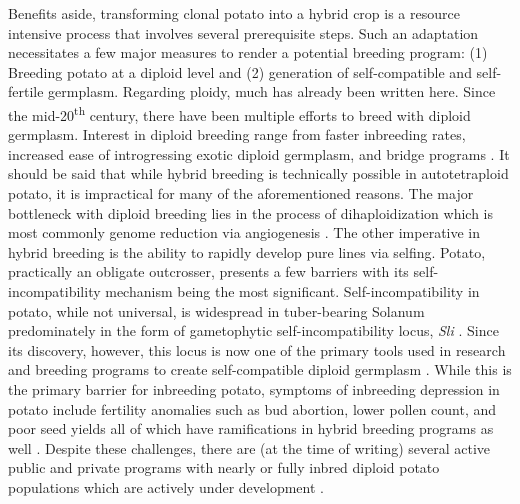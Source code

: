 \begin{refsection}
Benefits aside, transforming clonal potato into a hybrid crop is a
resource intensive process that involves several prerequisite steps.
Such an adaptation necessitates a few major measures to render a
potential breeding program: (1) Breeding potato at a diploid level and
(2) generation of self-compatible and self-fertile germplasm. Regarding
ploidy, much has already been written here. Since the
mid-20\textsuperscript{th} century, there have been multiple efforts to
breed with diploid germplasm. Interest in diploid breeding range from
faster inbreeding rates, increased ease of introgressing exotic diploid
germplasm, and bridge programs
\parencite{Krantz1946,Hougas1958,Chase1963}. It should be said that while
hybrid breeding is technically possible in autotetraploid potato, it is
impractical for many of the aforementioned reasons. The major bottleneck
with diploid breeding lies in the process of dihaploidization which is
most commonly genome reduction via angiogenesis
\parencite{Uijtewaal1987}. The other imperative in hybrid breeding is the
ability to rapidly develop pure lines via selfing. Potato, practically
an obligate outcrosser, presents a few barriers with its
self-incompatibility mechanism being the most significant.
Self-incompatibility in potato, while not universal, is widespread in
tuber-bearing Solanum predominately in the form of gametophytic
self-incompatibility locus, \emph{Sli} \parencite{Hosaka1998,Jing2025}.
Since its discovery, however, this locus is now one of the primary tools
used in research and breeding programs to create self-compatible diploid
germplasm \parencite{Ma2021,Eggers2021}. While this is the primary
barrier for inbreeding potato, symptoms of inbreeding depression in
potato include fertility anomalies such as bud abortion, lower pollen
count, and poor seed yields all of which have ramifications in hybrid
breeding programs as well \parencite{Pallais1987}. Despite these
challenges, there are (at the time of writing) several active public and
private programs with nearly or fully inbred diploid potato populations
which are actively under development
\parencite{Zhang2021,Song2023,DeVries2023}.


\end{refsection}
